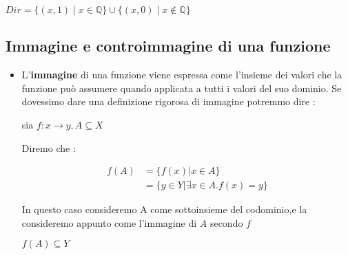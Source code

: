 \documentclass[article,12pt]{book}
\begin{document}
\begin{enumerate}
{\begin{center}
    $Dir=\{(x,1)\mid x\in\mathbb{Q}\}\cup\{(x,0)\mid x\notin\mathbb{Q}\}$
\end{center}

\newpage
\subsection{Immagine e controimmagine di una funzione}
\begin{itemize}
    \item L'\textbf{immagine} di una funzione viene espressa come l'insieme dei valori che la funzione può assumere quando applicata a tutti i valori del suo dominio.
Se dovessimo dare una definizione rigorosa di immagine potremmo dire :
    \begin{center}
        sia $f: x \rightarrow y, A \subseteq X$
    \end{center}
Diremo che :
    \begin{center}
    \begin{align}
        f(A) &= \{f(x) | x \in A \} \\
             &= \{y \in Y | \exists x \in A. f(x) = y \}
    \end{align}
    \end{center}
In questo caso consideremo A come sottoinsieme del codominio,e la consideremo appunto come l'immagine di $A$ secondo $f$ 
    \begin{center}
        $f(A) \subseteq Y$
    \end{center}


\end{itemize}}
\end{enumerate}
\end{document}
